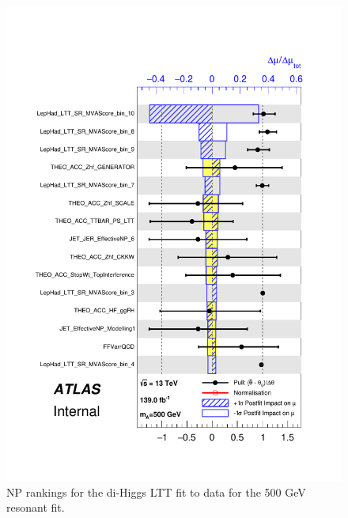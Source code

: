\begin{figure}
\centering
\includegraphics[width=.8\textwidth]{figures/results/HH/LepHad/pulls_SigXsecOverSM_500_LTT.pdf}
\caption{NP rankings for the di-Higgs \lephad LTT fit to data for the 500 GeV resonant fit.}
\label{fig:LepHadPostfitNPRankings2HDM500LTT}
\end{figure}

